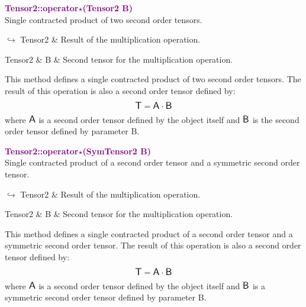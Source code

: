 \textcolor{purple}{\textbf{Tensor2::operator$\star$(Tensor2 B)}}\label{Tensor2::operator*(Tensor2 B)}\\
Single contracted product of two second order tensors.\vspace*{-0.5em}
\begin{tcolorbox}[grow to left by=-1cm, width=\textwidth-1cm,myArgs,tabularx={l|R}]
$\hookrightarrow$ Tensor2 & Result of the multiplication operation.
\end{tcolorbox}

\begin{tcolorbox}[width=\textwidth,myArgs,tabularx={ll|R}]
Tensor2 & B & Second tensor for the multiplication operation.
\end{tcolorbox}

This method defines a single contracted product of two second order tensors.
The result of this operation is also a second order tensor defined by:
\begin{equation*}
\mbox{\large\ensuremath{\mathsf{T}}} = \mbox{\large\ensuremath{\mathsf{A}}} \cdot \mbox{\large\ensuremath{\mathsf{B}}}
\end{equation*}
where $\mbox{\large\ensuremath{\mathsf{A}}}$ is a second order tensor defined by the object itself and $\mbox{\large\ensuremath{\mathsf{B}}}$ is the second order tensor defined by parameter B.

\textcolor{purple}{\textbf{Tensor2::operator$\star$(SymTensor2 B)}}\label{Tensor2::operator*(SymTensor2 B)}\\
Single contracted product of a second order tensor and a symmetric second order tensor.\vspace*{-0.5em}
\begin{tcolorbox}[grow to left by=-1cm, width=\textwidth-1cm,myArgs,tabularx={l|R}]
$\hookrightarrow$ Tensor2 & Result of the multiplication operation.
\end{tcolorbox}

\begin{tcolorbox}[width=\textwidth,myArgs,tabularx={ll|R}]
Tensor2 & B & Second tensor for the multiplication operation.
\end{tcolorbox}

This method defines a single contracted product of a second order tensor and a symmetric second order tensor.
The result of this operation is also a second order tensor defined by:
\begin{equation*}
\mbox{\large\ensuremath{\mathsf{T}}} = \mbox{\large\ensuremath{\mathsf{A}}} \cdot \mbox{\large\ensuremath{\mathsf{B}}}
\end{equation*}
where $\mbox{\large\ensuremath{\mathsf{A}}}$ is a second order tensor defined by the object itself and $\mbox{\large\ensuremath{\mathsf{B}}}$ is a symmetric second order tensor defined by parameter B.

